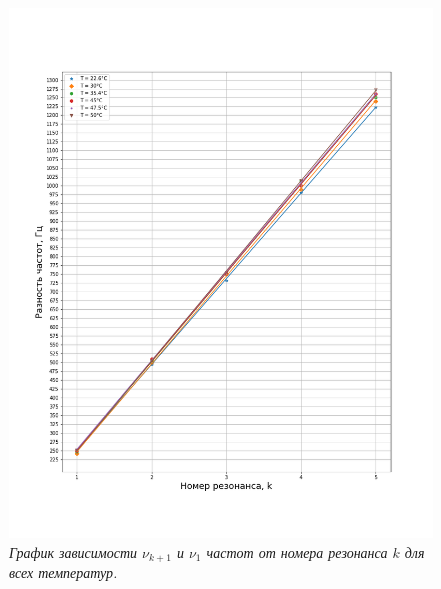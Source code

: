 \documentclass[a4paper, 12pt]{article}
\begin{document}
\begin{figure}[hb]
    \centering
    \includegraphics[width=\linewidth]{freqs_to_resonances.png}
    \caption{\textit{График зависимости $\nu_{k + 1}$ и $\nu_1$ частот от номера резонанса $k$ для всех температур.}}
    \label{fig:freqs_to_resonances}
\end{figure}
\end{document}
